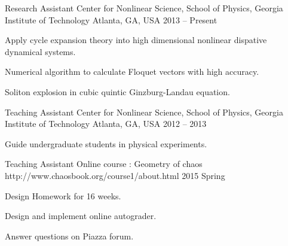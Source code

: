 


\begin{cventries}


\cventry
{Research Assistant}
{Center for Nonlinear Science, School of Physics,
  Georgia Institute of Technology}
{Atlanta, GA, USA}
{2013 -- Present}
{
  \begin{cvitems}
  \item {Apply cycle expansion theory into high dimensional nonlinear dispative dynamical systems.}
  \item {Numerical algorithm to calculate Floquet vectors with high accuracy.}
  \item {Soliton explosion in cubic quintic Ginzburg-Landau equation.} 
  \end{cvitems}
}


\cventry 
{Teaching Assistant}
{Center for Nonlinear Science, School of Physics,
  Georgia Institute of Technology}
{Atlanta, GA, USA}
{2012 -- 2013}
{
  \begin{cvitems}
  \item { Guide undergraduate students in physical experiments.}
  \end{cvitems}
}


\cventry 
{Teaching Assistant}
{Online course : Geometry of chaos}
{http://www.chaosbook.org/course1/about.html}
{2015 Spring}
{
  \begin{cvitems}
    \item {Design Homework for 16 weeks.}
    \item {Design and implement online autograder.}
    \item {Answer questions on Piazza forum.}
  \end{cvitems}
}


\end{cventries}
